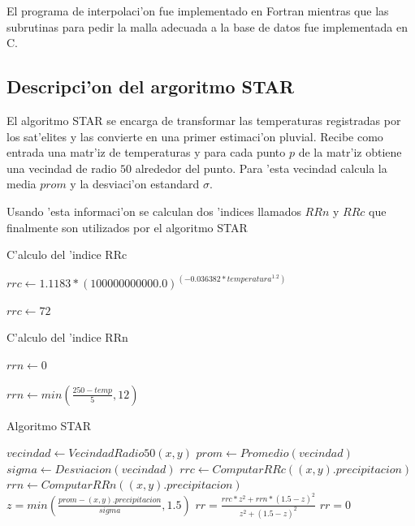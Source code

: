   El programa de interpolaci'on fue implementado en Fortran mientras que las subrutinas para 
  pedir la malla adecuada a la base de datos fue implementada en C.

\subsection{Descripci'on del argoritmo STAR}
  El algoritmo STAR se encarga de transformar las temperaturas registradas por los sat'elites y las convierte
  en una primer estimaci'on pluvial. Recibe como entrada una matr'iz de temperaturas y para cada punto $p$ de la matr'iz
  obtiene una vecindad de radio $50$ alrededor del punto. Para 'esta vecindad calcula la media $prom$ y la desviaci'on estandard $\sigma$.

  Usando 'esta informaci'on se calculan dos 'indices llamados $RRn$ y $RRc$ que finalmente son utilizados por el algoritmo STAR

  \begin{algorithm}
  \caption{C'alculo del 'indice RRc}

  \begin{algorithmic}
	  \STATE $rrc \gets 1.1183* (100000000000.0)^(-0.036382*temperatura^{1.2})$
  \ELSE
	  
	  \STATE $rrc \gets 72$ 
	  
  \ENDIF 
  \end{algorithmic}
  \end{algorithm}

  \begin{algorithm}
  \caption{C'alculo del 'indice RRn}

  \begin{algorithmic}
	  \STATE $rrn \gets 0$
  \ELSE
	  
	  \STATE $rrn \gets min(\frac{250-temp}{5}, 12)$ 
	  
  \ENDIF 
  \end{algorithmic}
  \end{algorithm}

  \begin{algorithm}
  \caption{Algoritmo STAR}

  \begin{algorithmic}
      \STATE $vecindad \gets VecindadRadio50(x,y)$
      \STATE $prom \gets Promedio(vecindad)$
      \STATE $sigma \gets Desviacion(vecindad)$  
      \STATE $rrc \gets ComputarRRc((x,y).precipitacion)$
      \STATE $rrn \gets ComputarRRn((x,y).precipitacion)$
      \STATE $z = min(\frac{prom-(x,y).precipitacion}{sigma}, 1.5)$
	\STATE $rr = \frac{rrc*z^2 + rrn*(1.5-z)^2}{z^2+ (1.5-z)^2}$
      \ELSE	  
	\STATE $rr = 0$   
      \ENDIF
    \ENDFOR
  \end{algorithmic}
  \end{algorithm}


